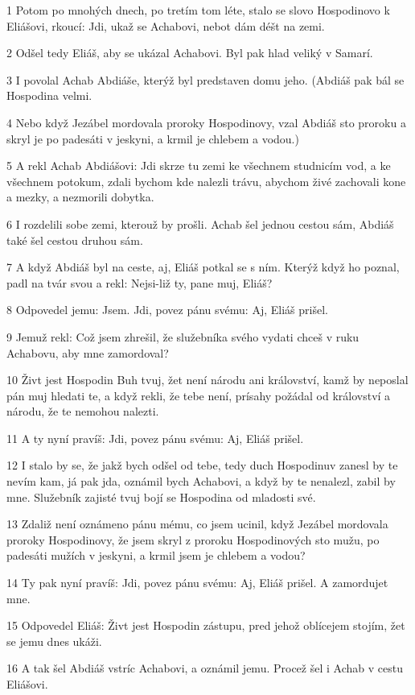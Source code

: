 \par 1 Potom po mnohých dnech, po tretím tom léte, stalo se slovo Hospodinovo k Eliášovi, rkoucí: Jdi, ukaž se Achabovi, nebot dám déšt na zemi.
\par 2 Odšel tedy Eliáš, aby se ukázal Achabovi. Byl pak hlad veliký v Samarí.
\par 3 I povolal Achab Abdiáše, kterýž byl predstaven domu jeho. (Abdiáš pak bál se Hospodina velmi.
\par 4 Nebo když Jezábel mordovala proroky Hospodinovy, vzal Abdiáš sto proroku a skryl je po padesáti v jeskyni, a krmil je chlebem a vodou.)
\par 5 A rekl Achab Abdiášovi: Jdi skrze tu zemi ke všechnem studnicím vod, a ke všechnem potokum, zdali bychom kde nalezli trávu, abychom živé zachovali kone a mezky, a nezmorili dobytka.
\par 6 I rozdelili sobe zemi, kterouž by prošli. Achab šel jednou cestou sám, Abdiáš také šel cestou druhou sám.
\par 7 A když Abdiáš byl na ceste, aj, Eliáš potkal se s ním. Kterýž když ho poznal, padl na tvár svou a rekl: Nejsi-liž ty, pane muj, Eliáš?
\par 8 Odpovedel jemu: Jsem. Jdi, povez pánu svému: Aj, Eliáš prišel.
\par 9 Jemuž rekl: Což jsem zhrešil, že služebníka svého vydati chceš v ruku Achabovu, aby mne zamordoval?
\par 10 Živt jest Hospodin Buh tvuj, žet není národu ani království, kamž by neposlal pán muj hledati te, a když rekli, že tebe není, prísahy požádal od království a národu, že te nemohou nalezti.
\par 11 A ty nyní pravíš: Jdi, povez pánu svému: Aj, Eliáš prišel.
\par 12 I stalo by se, že jakž bych odšel od tebe, tedy duch Hospodinuv zanesl by te nevím kam, já pak jda, oznámil bych Achabovi, a když by te nenalezl, zabil by mne. Služebník zajisté tvuj bojí se Hospodina od mladosti své.
\par 13 Zdaliž není oznámeno pánu mému, co jsem ucinil, když Jezábel mordovala proroky Hospodinovy, že jsem skryl z proroku Hospodinových sto mužu, po padesáti mužích v jeskyni, a krmil jsem je chlebem a vodou?
\par 14 Ty pak nyní pravíš: Jdi, povez pánu svému: Aj, Eliáš prišel. A zamordujet mne.
\par 15 Odpovedel Eliáš: Živt jest Hospodin zástupu, pred jehož oblícejem stojím, žet se jemu dnes ukáži.
\par 16 A tak šel Abdiáš vstríc Achabovi, a oznámil jemu. Procež šel i Achab v cestu Eliášovi.
